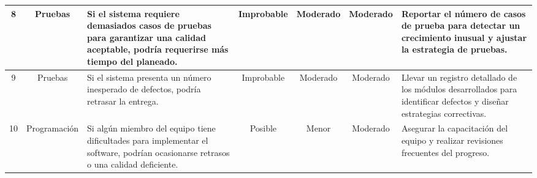 \begin{table}[h!]
\begin{tabular}{|c|c|p{4cm}|c|c|c|p{4cm}|}
				8 & Pruebas & Si el sistema requiere demasiados casos de pruebas para garantizar una calidad aceptable, podría requerirse más tiempo del planeado. & Improbable & Moderado & Moderado & Reportar el número de casos de prueba para detectar un crecimiento inusual y ajustar la estrategia de pruebas. \\ \hline
				9 & Pruebas & Si el sistema presenta un número inesperado de defectos, podría retrasar la entrega. & Improbable & Moderado & Moderado & Llevar un registro detallado de los módulos desarrollados para identificar defectos y diseñar estrategias correctivas. \\ \hline
				10 & Programación & Si algún miembro del equipo tiene dificultades para implementar el software, podrían ocasionarse retrasos o una calidad deficiente. & Posible & Menor & Moderado & Asegurar la capacitación del equipo y realizar revisiones frecuentes del progreso. \\ \hline
			\end{tabular}
	\end{table}
	
	\clearpage 
	
